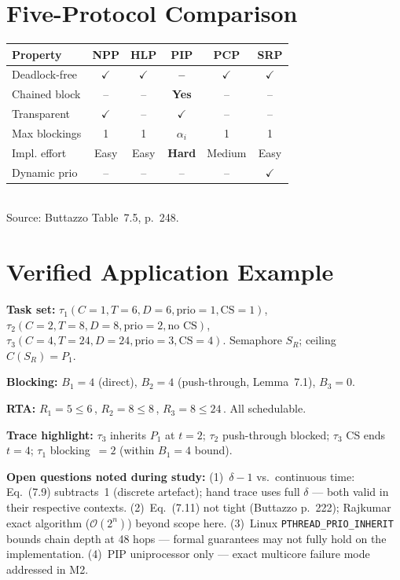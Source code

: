 \documentclass[conference,onecolumn]{IEEEtran}
\begin{document}
\section{Five-Protocol Comparison}

{\small
\begin{tabular}{@{}lccccc@{}}
\toprule
Property & NPP & HLP & PIP & PCP & SRP \\
\midrule
Deadlock-free & $\checkmark$ & $\checkmark$ & \textbf{--} & $\checkmark$ & $\checkmark$ \\
Chained block & -- & -- & \textbf{Yes} & -- & -- \\
Transparent & $\checkmark$ & -- & $\checkmark$ & -- & -- \\
Max blockings & 1 & 1 & $\alpha_i$ & 1 & 1 \\
Impl. effort & Easy & Easy & \textbf{Hard} & Medium & Easy \\
Dynamic prio & -- & -- & -- & -- & $\checkmark$ \\
\bottomrule
\end{tabular}}\\
Source: Buttazzo Table~7.5, p.~248.

\section{Verified Application Example}

\textbf{Task set:} $\tau_1(C{=}1,T{=}6,D{=}6,\text{prio}=1,\text{CS}=1)$,
$\tau_2(C{=}2,T{=}8,D{=}8,\text{prio}=2,\text{no~CS})$,
$\tau_3(C{=}4,T{=}24,D{=}24,\text{prio}=3,\text{CS}=4)$.
Semaphore $S_R$; ceiling $C(S_R)=P_1$.

\textbf{Blocking:} $B_1=4$ (direct), $B_2=4$ (push-through, Lemma~7.1),
$B_3=0$.

\textbf{RTA:} $R_1=5\leq 6$\,\checkmark, $R_2=8\leq 8$\,\checkmark,
$R_3=8\leq 24$\,\checkmark. All schedulable.

\textbf{Trace highlight:} $\tau_3$ inherits $P_1$ at $t=2$; $\tau_2$
push-through blocked; $\tau_3$ CS ends $t=4$; $\tau_1$ blocking~$=2$
(within $B_1=4$ bound).

\textbf{Open questions noted during study:}
(1)~$\delta{-}1$ vs.\ continuous time: Eq.~(7.9) subtracts~1 (discrete artefact);
hand trace uses full $\delta$ --- both valid in their respective contexts.
(2)~Eq.~(7.11) not tight (Buttazzo p.~222); Rajkumar exact algorithm
($\mathcal{O}(2^n)$) beyond scope here.
(3)~Linux \texttt{PTHREAD\_PRIO\_INHERIT} bounds chain depth at 48 hops
--- formal guarantees may not fully hold on the implementation.
(4)~PIP uniprocessor only --- exact multicore failure mode addressed in M2.
\end{document}
